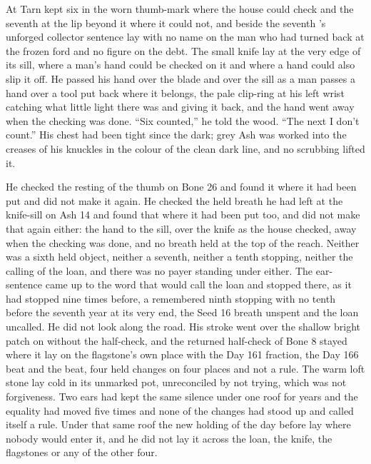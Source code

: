 \scenebreak

At  Tarn kept six in the worn thumb-mark where the house could check and the seventh at the lip beyond it where it could not, and beside the seventh 's unforged collector sentence lay with no name on the man who had turned back at the frozen ford and no figure on the debt. The small knife lay at the very edge of its sill, where a man's hand could be checked on it and where a hand could also slip it off. He passed his hand over the blade and over the sill as a man passes a hand over a tool put back where it belongs, the pale clip-ring at his left wrist catching what little light there was and giving it back, and the hand went away when the checking was done. “Six counted,” he told the wood. “The next I don't count.” His chest had been tight since the dark; grey Ash was worked into the creases of his knuckles in the colour of the clean dark line, and no scrubbing lifted it.

He checked the resting of the thumb on Bone 26 and found it where it had been put and did not make it again. He checked the held breath he had left at the knife-sill on Ash 14 and found that where it had been put too, and did not make that again either: the hand to the sill, over the knife as the house checked, away when the checking was done, and no breath held at the top of the reach. Neither was a sixth held object, neither a seventh, neither a tenth stopping, neither the calling of the loan, and there was no payer standing under either. The ear-sentence came up to the word that would call the loan and stopped there, as it had stopped nine times before, a remembered ninth stopping with no tenth before the seventh year at its very end, the Seed 16 breath unspent and the loan uncalled. He did not look along the road. His stroke went over the shallow bright patch on  without the half-check, and the returned half-check of Bone 8 stayed where it lay on the flagstone's own place with the Day 161 fraction, the Day 166 beat and the  beat, four held changes on four places and not a rule. The warm loft stone lay cold in its unmarked pot, unreconciled by not trying, which was not forgiveness. Two ears had kept the same silence under one roof for years and the equality had moved five times and none of the changes had stood up and called itself a rule. Under that same roof the new holding of the day before lay where nobody would enter it, and he did not lay it across the loan, the knife, the flagstones or any of the other four.

